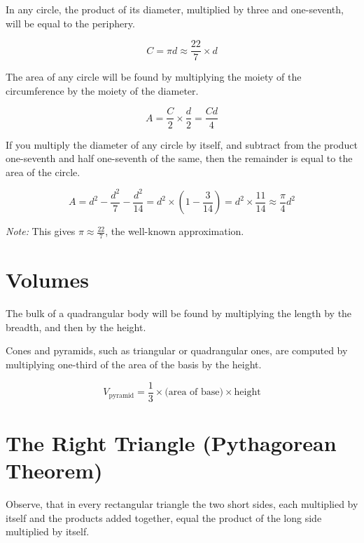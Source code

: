 \documentclass[11pt,a4paper]{book}
\newcommand{\cnote}[1]{\textcolor{notecolor}{\textit{#1}}}
\begin{document}
In any circle, the product of its diameter, multiplied by three and
one-seventh, will be equal to the periphery.

\begin{equation}
C = \pi d \approx \frac{22}{7} \times d
\end{equation}

The area of any circle will be found by multiplying the moiety of the
circumference by the moiety of the diameter.

\begin{equation}
A = \frac{C}{2} \times \frac{d}{2} = \frac{Cd}{4}
\end{equation}

If you multiply the diameter of any circle by itself, and subtract from the
product one-seventh and half one-seventh of the same, then the remainder is
equal to the area of the circle.

\begin{equation}
A = d^2 - \frac{d^2}{7} - \frac{d^2}{14} = d^2 \times \left(1 - \frac{3}{14}\right) = d^2 \times \frac{11}{14} \approx \frac{\pi}{4} d^2
\end{equation}

\cnote{Note:} This gives $\pi \approx \frac{22}{7}$, the well-known approximation.

\section*{Volumes}

The bulk of a quadrangular body will be found by multiplying the length by
the breadth, and then by the height.

Cones and pyramids, such as triangular or quadrangular ones, are computed by
multiplying one-third of the area of the basis by the height.

\begin{equation}
V_{\text{pyramid}} = \frac{1}{3} \times \text{(area of base)} \times \text{height}
\end{equation}

\section*{The Right Triangle (Pythagorean Theorem)}

Observe, that in every rectangular triangle the two short sides, each
multiplied by itself and the products added together, equal the product of
the long side multiplied by itself.
\end{document}
